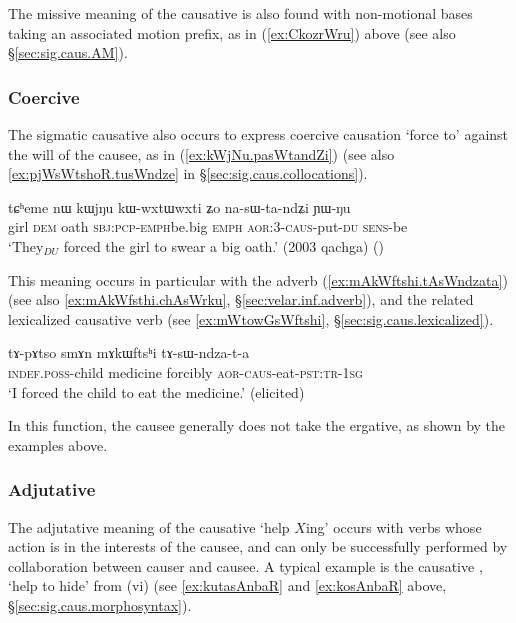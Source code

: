 The missive meaning of the causative is also found with non-motional bases taking an associated motion prefix, as in (\ref{ex:CkozrWru}) above (see also §\ref{sec:sig.caus.AM}).

\subsubsection{Coercive} \label{sec:sig.caus.coercitive}
The sigmatic causative also occurs to express coercive causation `force to' against the will of the causee, as in (\ref{ex:kWjNu.pasWtandZi}) (see also \ref{ex:pjWsWtshoR.tusWndze} in §\ref{sec:sig.caus.collocations}).

\begin{exe}
\ex \label{ex:kWjNu.pasWtandZi}
\gll tɕʰeme nɯ kɯjŋu kɯ-wxtɯ\redp{}wxti ʑo na-sɯ-ta-ndʑi ɲɯ-ŋu \\
girl \textsc{dem} oath \textsc{sbj}:\textsc{pcp}-\textsc{emph}\redp{}be.big \textsc{emph} \textsc{aor}:3\flobv{}-\textsc{caus}-put-\textsc{du} \textsc{sens}-be \\
\glt `They$_{DU}$ forced the girl to swear a big oath.' (2003 qachga)
()
\end{exe}

This meaning occurs in particular with the adverb  (\ref{ex:mAkWftshi.tAsWndzata}) (see also \ref{ex:mAkWfsthi.chAsWrku}, §\ref{sec:velar.inf.adverb}), and the related lexicalized causative verb  (see \ref{ex:mWtowGsWftshi}, §\ref{sec:sig.caus.lexicalized}).

\begin{exe}
\ex \label{ex:mAkWftshi.tAsWndzata}
\gll  tɤ-pɤtso smɤn mɤkɯftsʰi tɤ-sɯ-ndza-t-a \\
\textsc{indef}.\textsc{poss}-child medicine forcibly \textsc{aor}-\textsc{caus}-eat-\textsc{pst}:\textsc{tr}-\textsc{1sg} \\
\glt `I forced the child to eat the medicine.' (elicited)
\end{exe}

In this function, the causee generally does not take the ergative, as shown by the examples above.


\subsubsection{Adjutative} \label{sec:sig.caus.adjutative}
The adjutative meaning of the causative `help $X$ing' occurs with verbs whose action is in the interests of the causee, and can only be successfully performed by collaboration between causer and causee. A typical example is the causative , `help to hide' from  (vi) (see \ref{ex:kutasAnbaR} and \ref{ex:kosAnbaR} above, §\ref{sec:sig.caus.morphosyntax}).

